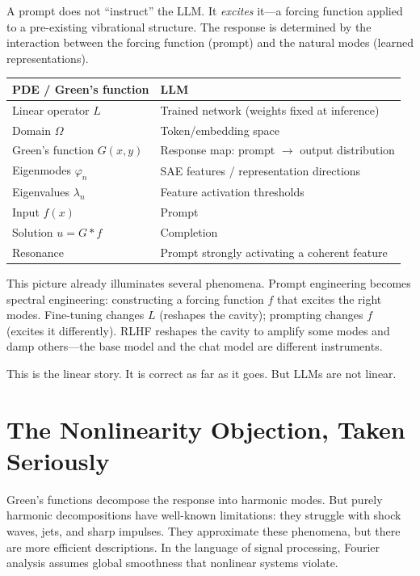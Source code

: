 \documentclass[11pt,a4paper]{article}
\begin{document}
A prompt does not ``instruct'' the LLM. It \emph{excites} it---a forcing
function applied to a pre-existing vibrational structure. The response is
determined by the interaction between the forcing function (prompt) and the
natural modes (learned representations).

\medskip
\begin{center}
\renewcommand{\arraystretch}{1.3}
\begin{tabular}{@{}ll@{}}
\toprule
\textbf{PDE / Green's function} & \textbf{LLM} \\
\midrule
Linear operator $L$ & Trained network (weights fixed at inference) \\
Domain $\Omega$ & Token/embedding space \\
Green's function $G(x,y)$ & Response map: prompt $\to$ output distribution \\
Eigenmodes $\varphi_n$ & SAE features / representation directions \\
Eigenvalues $\lambda_n$ & Feature activation thresholds \\
Input $f(x)$ & Prompt \\
Solution $u = G * f$ & Completion \\
Resonance & Prompt strongly activating a coherent feature \\
\bottomrule
\end{tabular}
\end{center}

\medskip
This picture already illuminates several phenomena. Prompt engineering becomes
spectral engineering: constructing a forcing function $f$ that excites the right
modes. Fine-tuning changes $L$ (reshapes the cavity); prompting changes $f$
(excites it differently). RLHF reshapes the cavity to amplify some modes and
damp others---the base model and the chat model are different instruments.

This is the linear story. It is correct as far as it goes. But LLMs are not linear.

\section{The Nonlinearity Objection, Taken Seriously}

Green's functions decompose the response into harmonic modes. But purely
harmonic decompositions have well-known limitations: they struggle with shock
waves, jets, and sharp impulses. They approximate these phenomena, but there
are more efficient descriptions. In the language of signal processing, Fourier
analysis assumes global smoothness that nonlinear systems violate.
\end{document}
